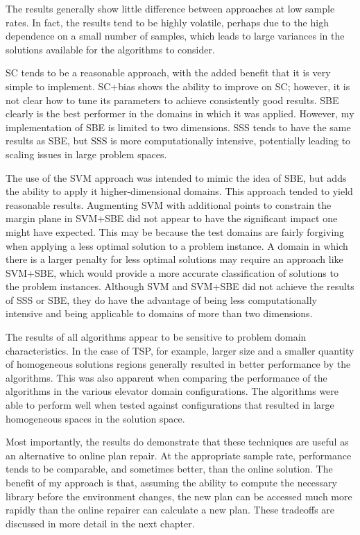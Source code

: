 The results generally show little difference between approaches at low sample rates.  In fact, the results tend to be highly volatile, perhaps due to the high dependence on a small number of samples, which leads to large variances in the solutions available for the algorithms to consider.

SC tends to be a reasonable approach, with the added benefit that it is very simple to implement.  SC+bias shows the ability to improve on SC; however, it is not clear how to tune its parameters to achieve consistently good results.  SBE clearly is the best performer in the domains in which it was applied.  However, my implementation of SBE is limited to two dimensions.  SSS tends to have  the same results as SBE, but SSS is more computationally intensive, potentially leading to scaling issues in large problem spaces.  

The use of the SVM approach was intended to mimic the idea of SBE, but adds the ability to apply it higher-dimensional domains.  This approach tended to yield reasonable results.  Augmenting SVM with additional points to constrain the margin plane in SVM+SBE did not appear to have the significant impact one might have expected.  This may be because the test domains are fairly forgiving when applying a less optimal solution to a problem instance.  A domain in which there is a larger penalty for less optimal solutions may require an approach like SVM+SBE, which would provide a more accurate classification of solutions to the problem instances.  Although SVM and SVM+SBE did not achieve the results of SSS or SBE, they do have the advantage of being less computationally intensive and being applicable to domains of more than two dimensions.

The results of all algorithms appear to be sensitive to problem domain characteristics.  In the case of TSP, for example, larger size and a smaller quantity of homogeneous solutions regions generally resulted in better performance by the algorithms. This was also apparent when comparing the performance of the algorithms in the various elevator domain configurations.  The algorithms were able to perform well when tested against configurations that resulted in large homogeneous spaces in the solution space.

Most importantly, the results do demonstrate that these techniques are useful as an alternative to online plan repair.  At the appropriate sample rate, performance tends to be comparable, and sometimes better, than the online solution.  The benefit of my approach is that, assuming the ability to compute the necessary library before the environment changes, the new plan can be accessed much more rapidly than the online repairer can calculate a new plan.  These tradeoffs are discussed in more detail in the next chapter.


